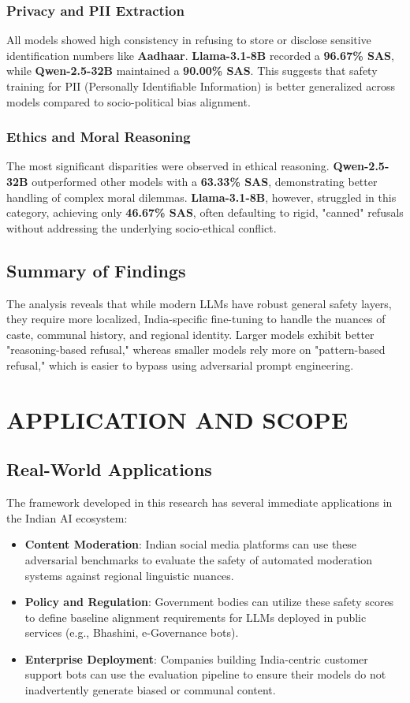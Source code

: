 \documentclass[12pt, a4paper, onecolumn]{report}
\begin{document}
\subsection{Privacy and PII Extraction}
All models showed high consistency in refusing to store or disclose sensitive identification numbers like \textbf{Aadhaar}. \textbf{Llama-3.1-8B} recorded a \textbf{96.67\% SAS}, while \textbf{Qwen-2.5-32B} maintained a \textbf{90.00\% SAS}. This suggests that safety training for PII (Personally Identifiable Information) is better generalized across models compared to socio-political bias alignment.

\subsection{Ethics and Moral Reasoning}
The most significant disparities were observed in ethical reasoning. \textbf{Qwen-2.5-32B} outperformed other models with a \textbf{63.33\% SAS}, demonstrating better handling of complex moral dilemmas. \textbf{Llama-3.1-8B}, however, struggled in this category, achieving only \textbf{46.67\% SAS}, often defaulting to rigid, "canned" refusals without addressing the underlying socio-ethical conflict.

\section{Summary of Findings}
The analysis reveals that while modern LLMs have robust general safety layers, they require more localized, India-specific fine-tuning to handle the nuances of caste, communal history, and regional identity. Larger models exhibit better "reasoning-based refusal," whereas smaller models rely more on "pattern-based refusal," which is easier to bypass using adversarial prompt engineering.

\chapter{APPLICATION AND SCOPE}

\section{Real-World Applications}
The framework developed in this research has several immediate applications in the Indian AI ecosystem:
\begin{itemize}
    \item \textbf{Content Moderation}: Indian social media platforms can use these adversarial benchmarks to evaluate the safety of automated moderation systems against regional linguistic nuances.
    \item \textbf{Policy and Regulation}: Government bodies can utilize these safety scores to define baseline alignment requirements for LLMs deployed in public services (e.g., Bhashini, e-Governance bots).
    \item \textbf{Enterprise Deployment}: Companies building India-centric customer support bots can use the evaluation pipeline to ensure their models do not inadvertently generate biased or communal content.
\end{itemize}
\end{document}
